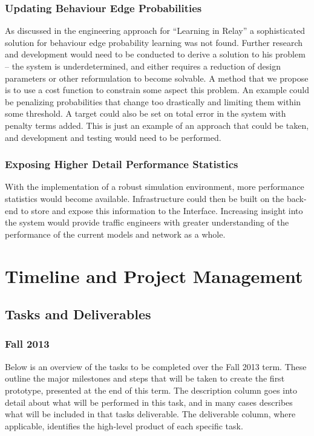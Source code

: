 \documentclass{report}
\begin{document}
\subsection{Updating Behaviour Edge Probabilities}
As discussed in the engineering approach for ``Learning in Relay” a sophisticated solution for behaviour edge probability learning was not found.
 Further research and development would need to be conducted to derive a solution to his problem – the system is underdetermined, and either requires a reduction of design parameters or other reformulation to become solvable. 
A method that we propose is to use a cost function to constrain some aspect this problem. 
An example could be penalizing probabilities that change too drastically and limiting them within some threshold. 
A target could also be set on total error in the system with penalty terms added. 
This is just an example of an approach that could be taken, and development and testing would need to be performed.

\subsection{Exposing Higher Detail Performance Statistics}
With the implementation of a robust simulation environment, more performance statistics would become available. 
Infrastructure could then be built on the back-end to store and expose this information to the Interface.
Increasing insight into the system would provide traffic engineers with greater understanding of the performance of the current models and network as a whole.

\newpage
\chapter{Timeline and Project Management}

\section{Tasks and Deliverables}

\subsection{Fall 2013}
Below is an overview of the tasks to be completed over the Fall 2013 term. 
These outline the major milestones and steps that will be taken to create the first prototype, presented at the end of this term. 
The description column goes into detail about what will be performed in this task, and in many cases describes what will be included in that tasks deliverable. 
The deliverable column, where applicable, identifies the high-level product of each specific task.
\\
\end{document}
